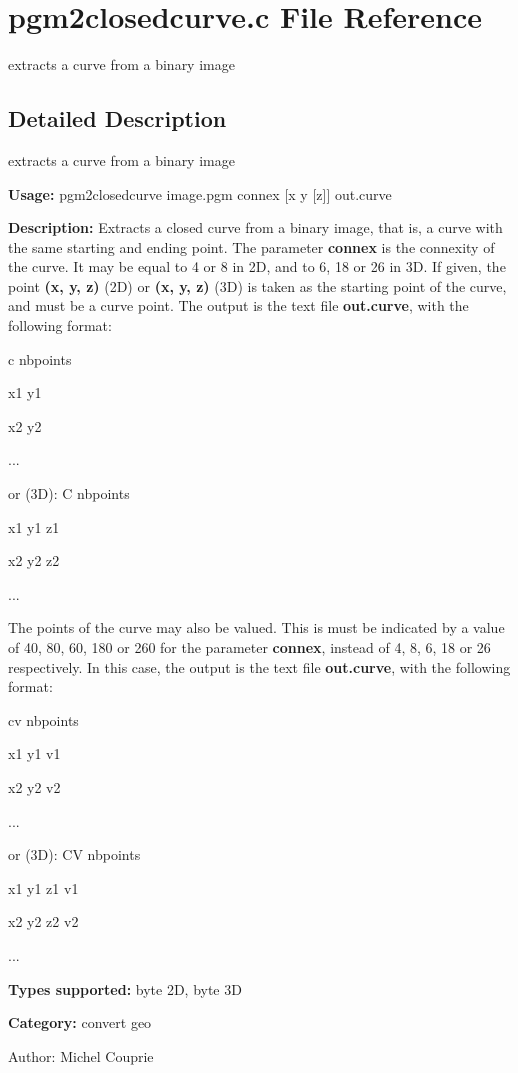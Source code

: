 \section{pgm2closedcurve.c File Reference}
\label{pgm2closedcurve_8c}
extracts a curve from a binary image  




\label{_details}
\subsection{Detailed Description}
extracts a curve from a binary image 

{\bf Usage:} pgm2closedcurve image.pgm connex [x y [z]] out.curve

{\bf Description:} Extracts a closed curve from a binary image, that is, a curve with the same starting and ending point. The parameter {\bf connex} is the connexity of the curve. It may be equal to 4 or 8 in 2D, and to 6, 18 or 26 in 3D. If given, the point {\bf (x, y, z)} (2D) or {\bf (x, y, z)} (3D) is taken as the starting point of the curve, and must be a curve point. The output is the text file {\bf out.curve}, with the following format:\par
 c nbpoints\par
 x1 y1\par
 x2 y2\par
 ...\par
 or (3D): C nbpoints\par
 x1 y1 z1\par
 x2 y2 z2\par
 ...\par


The points of the curve may also be valued. This is must be indicated by a value of 40, 80, 60, 180 or 260 for the parameter {\bf connex}, instead of 4, 8, 6, 18 or 26 respectively. In this case, the output is the text file {\bf out.curve}, with the following format:\par
 cv nbpoints\par
 x1 y1 v1\par
 x2 y2 v2\par
 ...\par
 or (3D): CV nbpoints\par
 x1 y1 z1 v1\par
 x2 y2 z2 v2\par
 ...\par


{\bf Types supported:} byte 2D, byte 3D

{\bf Category:} convert geo

\begin{Desc}
\item[Author:]Michel Couprie \end{Desc}
